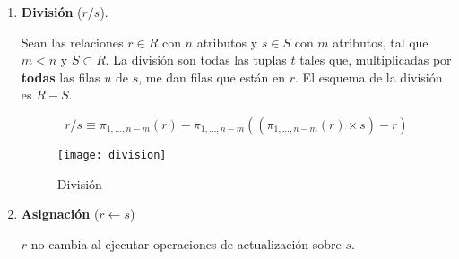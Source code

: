 \documentclass[a4paper, twoside]{article}
\begin{document}
\begin{enumerate}
\item \textbf{División} ($r/s$). 


Sean las relaciones $r\in R$ con $n$ atributos y $s\in S$ con $m$
atributos, tal que $m<n$ y $S\subset R$. La división son todas las
tuplas $t$ tales que, multiplicadas por \textbf{todas} las filas
$u$ de $s$, me dan filas que están en $r$. El esquema de la división
es $R-S$.


\[
r/s\equiv\pi_{1,\dots,n-m}(r)-\pi_{1,\dots,n-m}\left(\left(\pi_{1,\dots,n-m}(r)\times s\right)-r\right)
\]



\begin{figure}[H]
\noindent \begin{centering}
\texttt{[image: division]}
\par\end{centering}

\protect\caption{División}
\end{figure}


\item \textbf{Asignación} ($r\leftarrow s$)


$r$ no cambia al ejecutar operaciones de actualización sobre $s$.

\end{enumerate}
\end{document}
